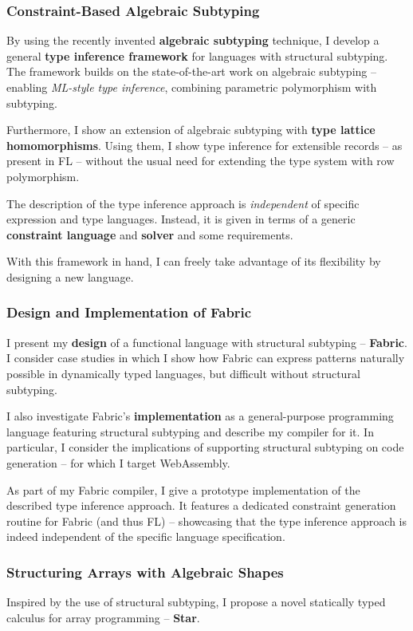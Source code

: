 \subsubsection{Constraint-Based Algebraic Subtyping}

By using the recently invented \textbf{algebraic subtyping} technique, I develop a general \textbf{type inference framework} for languages with structural subtyping. 
The framework builds on the state-of-the-art work on algebraic subtyping -- enabling \textit{ML-style type inference}, combining parametric polymorphism with subtyping. 

Furthermore, I show an extension of algebraic subtyping with \textbf{type lattice homomorphisms}. Using them, I show type inference for extensible records -- as present in FL -- without the usual need for extending the type system with row polymorphism.

The description of the type inference approach is \emph{independent} of specific expression and type languages. Instead, it is given in terms of a generic \textbf{constraint language} and \textbf{solver} and some requirements. 

With this framework in hand, I can freely take advantage of its flexibility by designing a new language.

\subsubsection{Design and Implementation of Fabric}
I present my \textbf{design} of a functional language with structural subtyping -- \textbf{Fabric}. 
I consider case studies in which I show how Fabric can express patterns naturally possible in dynamically typed languages, but difficult without structural subtyping. 

I also investigate Fabric's \textbf{implementation} as a general-purpose programming language featuring structural subtyping and describe my compiler for it. In particular, I consider the implications of supporting structural subtyping on code generation -- for which I target WebAssembly.

As part of my Fabric compiler, I give a prototype implementation of the described type inference approach. It features a dedicated constraint generation routine for Fabric (and thus FL) -- showcasing that the type inference approach is indeed independent of the specific language specification.

\subsubsection{Structuring Arrays with Algebraic Shapes}
Inspired by the use of structural subtyping, I propose a novel statically typed calculus for array programming -- \textbf{Star}. 

